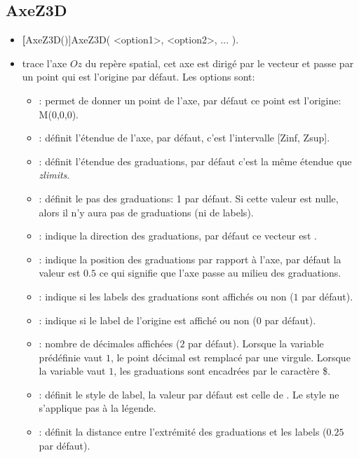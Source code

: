 \subsection{AxeZ3D}
\begin{itemize}
 \item \util \textbf[AxeZ3D()]{AxeZ3D( <option1>, <option2>, ... )}.
 \item \desc trace l'axe $Oz$ du repère spatial, cet axe est dirigé par le vecteur  et passe par un point qui est l'origine par défaut. Les options sont:

  \begin{itemize}
  \item {}: permet de donner un point de l'axe, par défaut ce point est l'origine: M(0,0,0).
  \item {}: définit l'étendue de l'axe, par défaut, c'est l'intervalle [Zinf, Zsup].
  \item \opt{zgradlimits}{[z1,z2}: définit l'étendue des graduations, par défaut c'est la même étendue que
\textit{zlimits}.
  \item {}: définit le pas des graduations: 1 par défaut. Si cette valeur est nulle, alors il n'y aura pas de graduations (ni de labels).
  \item {}: indique la direction des graduations, par défaut ce vecteur est .
  \item {}: indique la position des graduations par rapport à l'axe, par défaut la valeur est $0.5$ ce qui signifie que l'axe passe au milieu des graduations.
  \item {}: indique si les labels des graduations sont affichés ou non ($1$ par défaut).
  \item {}: indique si le label de l'origine est affiché ou non ($0$ par défaut).
  \item {}: nombre de décimales affichées ($2$ par défaut). Lorsque la variable prédéfinie  vaut $1$, le point décimal est remplacé par une virgule. Lorsque la variable  vaut $1$, les graduations sont encadrées par le caractère \$.
  \item {}: définit le style de label, la valeur par défaut est celle de . Le style ne s'applique pas à la légende.
  \item {}: définit la distance entre l'extrémité des graduations et les labels ($0.25$ par défaut).

\end{itemize}
\end{itemize}

